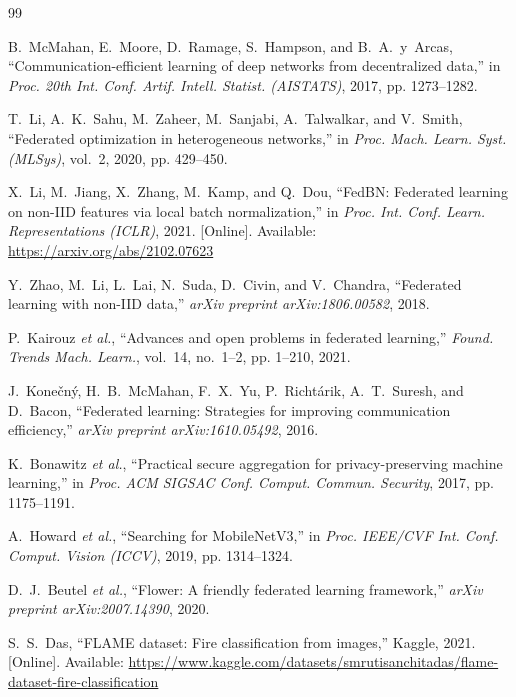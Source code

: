 \documentclass[journal]{IEEEtran}
\begin{document}
\begin{thebibliography}{99}

B.~McMahan, E.~Moore, D.~Ramage, S.~Hampson, and B.~A.~y~Arcas, ``Communication-efficient learning of deep networks from decentralized data,'' in \emph{Proc. 20th Int. Conf. Artif. Intell. Statist. (AISTATS)}, 2017, pp. 1273--1282.

T.~Li, A.~K.~Sahu, M.~Zaheer, M.~Sanjabi, A.~Talwalkar, and V.~Smith, ``Federated optimization in heterogeneous networks,'' in \emph{Proc. Mach. Learn. Syst. (MLSys)}, vol.~2, 2020, pp. 429--450.

X.~Li, M.~Jiang, X.~Zhang, M.~Kamp, and Q.~Dou, ``FedBN: Federated learning on non-IID features via local batch normalization,'' in \emph{Proc. Int. Conf. Learn. Representations (ICLR)}, 2021. [Online]. Available: \url{https://arxiv.org/abs/2102.07623}

Y.~Zhao, M.~Li, L.~Lai, N.~Suda, D.~Civin, and V.~Chandra, ``Federated learning with non-IID data,'' \emph{arXiv preprint arXiv:1806.00582}, 2018.

P.~Kairouz \emph{et al.}, ``Advances and open problems in federated learning,'' \emph{Found. Trends Mach. Learn.}, vol.~14, no.~1--2, pp. 1--210, 2021.

J.~Kone\v{c}n\'{y}, H.~B.~McMahan, F.~X.~Yu, P.~Richt\'{a}rik, A.~T.~Suresh, and D.~Bacon, ``Federated learning: Strategies for improving communication efficiency,'' \emph{arXiv preprint arXiv:1610.05492}, 2016.

K.~Bonawitz \emph{et al.}, ``Practical secure aggregation for privacy-preserving machine learning,'' in \emph{Proc. ACM SIGSAC Conf. Comput. Commun. Security}, 2017, pp. 1175--1191.

A.~Howard \emph{et al.}, ``Searching for MobileNetV3,'' in \emph{Proc. IEEE/CVF Int. Conf. Comput. Vision (ICCV)}, 2019, pp. 1314--1324.

D.~J.~Beutel \emph{et al.}, ``Flower: A friendly federated learning framework,'' \emph{arXiv preprint arXiv:2007.14390}, 2020.

S.~S.~Das, ``FLAME dataset: Fire classification from images,'' Kaggle, 2021. [Online]. Available: \url{https://www.kaggle.com/datasets/smrutisanchitadas/flame-dataset-fire-classification}


\end{thebibliography}
\end{document}
